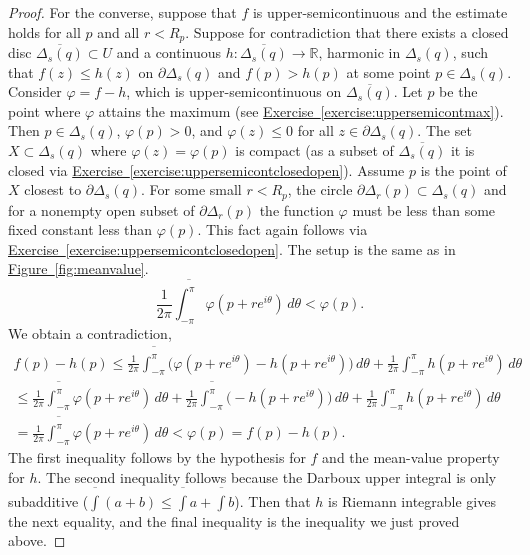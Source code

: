 \documentclass[12pt,openany]{book}
\newcommand{\R}{{\mathbb{R}}}
\theoremstyle{plain}
\theoremstyle{remark}
\theoremstyle{definition}
\theoremstyle{exercise}
\theoremstyle{example}
\newcommand{\figureref}[1]{\hyperref[#1]{Figure~\ref*{#1}}}
\newcommand{\exerciseref}[1]{\hyperref[#1]{Exercise~\ref*{#1}}}
\begin{document}
\begin{proof}
For the converse,
suppose that $f$ is upper-semicontinuous and
the estimate holds for all $p$ and all $r < R_p$.
Suppose for contradiction that
there exists a closed disc 
$\overline{\Delta_s(q)} \subset U$ and a continuous
$h \colon \overline{\Delta_s(q)} \to \R$, harmonic in $\Delta_s(q)$,
such that $f(z) \leq h(z)$ on $\partial \Delta_s(q)$ and
$f(p) > h(p)$ at some point $p \in \Delta_s(q)$.
Consider $\varphi = f-h$, which is upper-semicontinuous
on $\overline{\Delta_s(q)}$.
Let $p$ be the point where $\varphi$ attains the maximum 
(see \exerciseref{exercise:uppersemicontmax}).
Then $p \in \Delta_s(q)$,
$\varphi(p) > 0$, and $\varphi(z) \leq 0$
for all $z \in \partial \Delta_s(q)$.  The set
$X \subset \Delta_s(q)$ where $\varphi(z) = \varphi(p)$ is compact
(as a subset of $\overline{\Delta_s(q)}$ it is closed via
\exerciseref{exercise:uppersemicontclosedopen}).
Assume $p$ is the point of $X$ closest to
$\partial \Delta_s(q)$.
For some small $r < R_p$, the circle
$\partial \Delta_r(p) \subset \Delta_s(q)$ and for a nonempty open subset
of $\partial \Delta_r(p)$ the function $\varphi$ must be less than some fixed
constant less than $\varphi(p)$.  This fact again follows via 
\exerciseref{exercise:uppersemicontclosedopen}.
The setup is the same as in \figureref{fig:meanvalue}.
\begin{equation*}
\frac{1}{2\pi} \overline{\int_{-\pi}^{\pi}} \varphi(p+re^{i\theta})\, d\theta <
\varphi(p) .
\end{equation*}
We obtain
a contradiction,
\begin{multline*}
f(p)-h(p)
\leq
\frac{1}{2\pi} \overline{\int_{-\pi}^{\pi}}
\bigl( \varphi(p+re^{i\theta}) -
h(p+re^{i\theta}) \bigr)
\, d\theta
+
\frac{1}{2\pi} \int_{-\pi}^{\pi} h(p+re^{i\theta}) \, d\theta
\\
\leq
\frac{1}{2\pi} \overline{\int_{-\pi}^{\pi}}
\varphi(p+re^{i\theta})
\, d\theta
+
\frac{1}{2\pi} \overline{\int_{-\pi}^{\pi}}
\bigl( - h(p+re^{i\theta}) \bigr)
\, d\theta
+
\frac{1}{2\pi} \int_{-\pi}^{\pi} h(p+re^{i\theta}) \, d\theta
\\
=
\frac{1}{2\pi} \overline{\int_{-\pi}^{\pi}} \varphi(p+re^{i\theta})\, d\theta <
\varphi(p) =
f(p)-h(p) .
\end{multline*}
The first inequality follows by the hypothesis for $f$ and the mean-value
property for $h$.  The second inequality
follows because the Darboux upper integral is
only subadditive ($\overline{\int} (a+b) \leq \overline{\int}a +
\overline{\int} b$).  Then that $h$ is Riemann integrable gives the next
equality, and the final inequality is the inequality we just proved above.
\end{proof}
\end{document}
